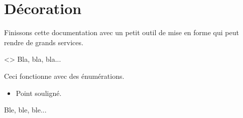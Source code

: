 \documentclass{../main/main}
\begin{document}
\section{Décoration}

Finissons cette documentation avec un petit outil de mise en forme qui peut rendre de grands services.


\begin{tdoclatex}<>
Bla, bla, bla...

\tdocsep %

Ceci fonctionne avec des énumérations.

\begin{itemize}
    \item Point souligné.
\end{itemize}

\tdocsep %

Ble, ble, ble...
\end{tdoclatex}
\end{document}
